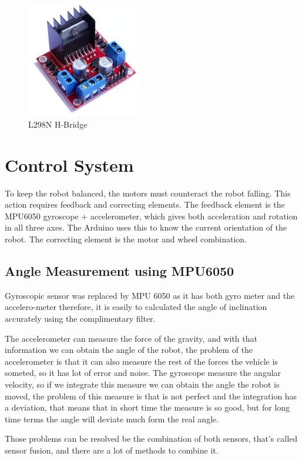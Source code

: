 \documentclass{article}
\begin{document}
 	\begin{figure}[h]
 		\centering
 		\includegraphics[width=50mm,scale=0.5]{L298N}
 		\caption{L298N H-Bridge}
 		\label{L298N H-Bridge}
 	\end{figure}
 
 	\pagebreak
 	
 	\section{Control System}
 	
 	To keep the robot balanced, the motors must counteract the robot falling. This action requires feedback and correcting elements. The feedback element is the MPU6050 gyroscope + accelerometer, which gives both acceleration and rotation in all three axes. The Arduino uses this to know the current orientation of the robot. The correcting element is the motor and wheel combination. 
 	
 	\subsection{Angle Measurement using MPU6050}
 	Gyroscopic sensor was replaced by MPU 6050 as it has both gyro meter and the accelero-meter therefore, it is easily to calculated the angle of inclination accurately using the complimentary filter. 
 	
 	The accelerometer can measure the force of the gravity, and with that information we can obtain the angle of the robot, the problem of the accelerometer is that it can also measure the rest of the forces the vehicle is someted, so it has lot of error and noise. The gyroscope measure the angular velocity, so if we integrate this measure we can obtain the angle the robot is moved, the problem of this measure is that is not perfect and the integration has a deviation, that means that in short time the measure is so good, but for long time terms the angle will deviate much form the real angle.

Those problems can be resolved be the combination of both sensors, that's called sensor fusion, and there are a lot of methods to combine it. 
 	
\end{document}
